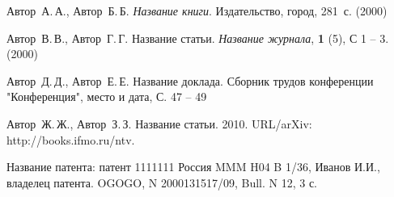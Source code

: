 \documentclass{nsart_eng}
\begin{document}
\begin{thebibliography}{99}
Автор~А.\,А., Автор~Б.\,Б. {\it Название книги}.  Издательство,  город, 281~с. (2000)

Автор~В.\,В., Автор~Г.\,Г. Название статьи. {\it Название журнала}, {\bf 1} (5), С 1 -- 3. (2000)

Автор~Д.\,Д., Автор~Е.\,Е. Название доклада. Сборник трудов конференции "Конференция", место и дата, С. 47 -- 49

Автор~Ж.\,Ж., Автор~З.\,З. Название статьи.  2010.
URL/arXiv: http://books.ifmo.ru/ntv.

Название патента: патент 1111111 Россия MMM H04 B 1/36, Иванов И.И., владелец патента. OGOGO, N 2000131517/09, Bull. N 12, 3 с.


\end{thebibliography}
\end{document}
